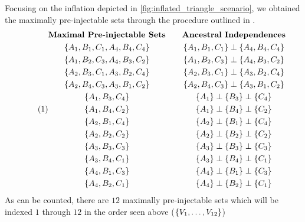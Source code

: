 \documentclass[aps, 10pt, english, twoside, pra, nofootinbib, longbibliography]{revtex4-1}
\theoremstyle{plain}
\theoremstyle{definition}
\theoremstyle{remark}
\newcommand{\ancestralindep}{\perp}
\begin{document}
    Focusing on the inflation depicted in \cref{fig:inflated_triangle_scenario}, we obtained the maximally pre-injectable sets through the procedure outlined in \cite{Inflation}.
    \begin{equation*}
        \eq \label{eq:pre-injectable_triangle_scenario}
        \begin{gathered}
            \textbf{Maximal Pre-injectable Sets} \\
            \bc{A_1, B_1, C_1, A_4, B_4, C_4} \\
            \bc{A_1, B_2, C_3, A_4, B_3, C_2} \\
            \bc{A_2, B_3, C_1, A_3, B_2, C_4} \\
            \bc{A_2, B_4, C_3, A_3, B_1, C_2} \\
            \bc{A_1, B_3, C_4} \\
            \bc{A_1, B_4, C_2} \\
            \bc{A_2, B_1, C_4} \\
            \bc{A_2, B_2, C_2} \\
            \bc{A_3, B_3, C_3} \\
            \bc{A_3, B_4, C_1} \\
            \bc{A_4, B_1, C_3} \\
            \bc{A_4, B_2, C_1}
        \end{gathered}
        \qquad
        \begin{gathered}
            \textbf{Ancestral Independences} \\
            \bc{A_1, B_1, C_1} \ancestralindep \bc{A_4, B_4, C_4} \\
            \bc{A_1, B_2, C_3} \ancestralindep \bc{A_4, B_3, C_2} \\
            \bc{A_2, B_3, C_1} \ancestralindep \bc{A_3, B_2, C_4} \\
            \bc{A_2, B_4, C_3} \ancestralindep \bc{A_3, B_1, C_2} \\
            \bc{A_1} \ancestralindep \bc{B_3} \ancestralindep \bc{C_4} \\
            \bc{A_1} \ancestralindep \bc{B_4} \ancestralindep \bc{C_2} \\
            \bc{A_2} \ancestralindep \bc{B_1} \ancestralindep \bc{C_4} \\
            \bc{A_2} \ancestralindep \bc{B_2} \ancestralindep \bc{C_2} \\
            \bc{A_3} \ancestralindep \bc{B_3} \ancestralindep \bc{C_3} \\
            \bc{A_3} \ancestralindep \bc{B_4} \ancestralindep \bc{C_1} \\
            \bc{A_4} \ancestralindep \bc{B_1} \ancestralindep \bc{C_3} \\
            \bc{A_4} \ancestralindep \bc{B_2} \ancestralindep \bc{C_1}
        \end{gathered}
    \end{equation*}
    As can be counted, there are $12$ maximally pre-injectable sets which will be indexed $1$ through $12$ in the order seen above ($\left\{ V_1, \ldots, V_{12} \right\}$)
\end{document}
